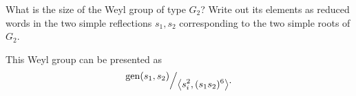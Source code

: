 \documentclass[12pt]{memoir}
\begin{document}
\begin{Ej}
    What is the size of the Weyl group of type $G_2$? Write out its elements as reduced words in
    the two simple reflections $s_1, s_2$ corresponding to the two simple roots of $G_2$.
\end{Ej}

\begin{ptcbr}
This Weyl group can be presented as
$$\quot{\gen(s_1,s_2)}{\genr{s_i^2,(s_1s_2)^6}}.$$
\end{ptcbr}
\end{document}
